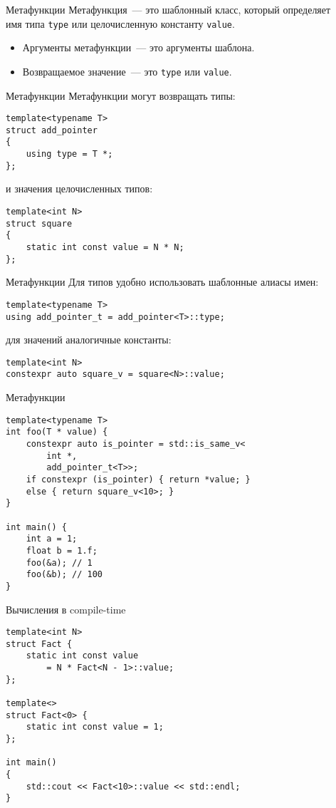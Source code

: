 \documentclass{beamer}
\begin{document}
\begin{frame}[fragile]{Метафункции}
Метафункция~--- это шаблонный класс, 
который определяет \\имя типа \texttt{type} или целочисленную константу \texttt{value}.


\begin{itemize}
\item Аргументы метафункции~--- это аргументы шаблона.
\item Возвращаемое значение~--- это \texttt{type} или \texttt{value}.
\end{itemize}
\end{frame}

\begin{frame}[fragile]{Метафункции}
Метафункции могут возвращать типы:
\begin{lstlisting}
template<typename T> 
struct add_pointer
{
    using type = T *; 
};
\end{lstlisting}
и значения целочисленных типов:
\begin{lstlisting}
template<int N> 
struct square
{
    static int const value = N * N; 
};
\end{lstlisting}
\end{frame}

\begin{frame}[fragile]{Метафункции}
Для типов удобно использовать шаблонные алиасы имен:
\begin{lstlisting}
template<typename T>
using add_pointer_t = add_pointer<T>::type;
\end{lstlisting}
для значений аналогичные константы:
\begin{lstlisting}
template<int N> 
constexpr auto square_v = square<N>::value; 
\end{lstlisting}
\end{frame}

\begin{frame}[fragile]{Метафункции}
\begin{lstlisting}
template<typename T>
int foo(T * value) {
    constexpr auto is_pointer = std::is_same_v<
        int *,
        add_pointer_t<T>>;
    if constexpr (is_pointer) { return *value; }
    else { return square_v<10>; }
}

int main() {
    int a = 1;
    float b = 1.f;
    foo(&a); // 1
    foo(&b); // 100
}
\end{lstlisting}

\end{frame}


\begin{frame}[fragile]{Вычисления в compile-time}
\begin{lstlisting}
template<int N> 
struct Fact {
    static int const value
        = N * Fact<N - 1>::value;
};

template<> 
struct Fact<0> {
    static int const value = 1;
};

int main() 
{
    std::cout << Fact<10>::value << std::endl;
}
\end{lstlisting}
\end{frame}
\end{document}

